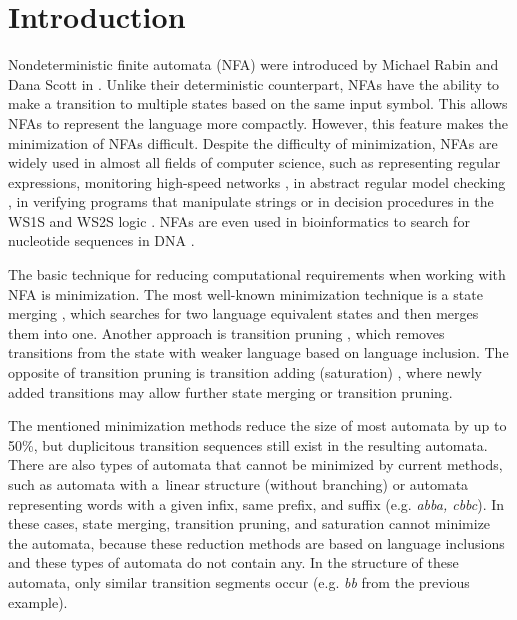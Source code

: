 \section{Introduction}

    Nondeterministic finite automata (NFA) were introduced by Michael Rabin and Dana Scott in \cite{FA_and_Their_Decisin_Problems}. Unlike their deterministic counterpart, NFAs have the ability to make a transition to multiple states based on the same input symbol. This allows NFAs to represent the language more compactly. However, this feature makes the minimization of NFAs difficult. Despite the difficulty of minimization, NFAs are widely used in almost all fields of computer science, such as representing regular expressions, monitoring high-speed networks \cite{FPGA_based_network_scaning}, in abstract regular model checking \cite{ARMC}, in verifying programs that manipulate strings \cite{String_constraints_for_ver} or in decision procedures in the WS1S and WS2S logic \cite{On_equivalence_checking, Nested_antichains_for_WS1S}. NFAs are even used in bioinformatics to search for nucleotide sequences in DNA \cite{DNA_pattern_analysis_using_FA}.

    The basic technique for reducing computational requirements when working with NFA is minimization. The most well-known minimization technique is a state merging \cite{Oldest_Merge,Simulation_based_minimization,On_nfa_reduction}, which searches for two language equivalent states and then merges them into one. Another approach is transition pruning \cite{Simulation_based_minimization, Lorenzo_prunning_saturation}, which removes transitions from the state with weaker language based on language inclusion. The opposite of transition pruning is transition adding (saturation) \cite{Oldest_Merge, Lorenzo_prunning_saturation}, where newly added transitions may allow further state merging or transition pruning.

    The mentioned minimization methods reduce the size of most automata by up to 50\%, but duplicitous transition sequences still exist in the resulting automata. There are also types of automata that cannot be minimized by current methods, such as automata with a~linear structure (without branching) or automata representing words with a given infix, same prefix, and suffix (e.g. \textit{abba, cbbc}). In these cases, state merging, transition pruning, and saturation cannot minimize the automata, because these reduction methods are based on language inclusions and these types of automata do not contain any. In the structure of these automata, only similar transition segments occur (e.g. \textit{bb} from the previous example).


